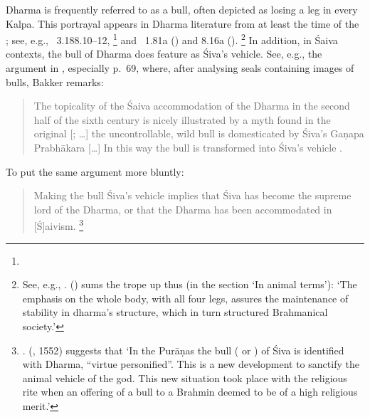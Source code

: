 Dharma is frequently referred to as a
bull, often depicted as losing a leg in every Kalpa.
This portrayal appears in Dharma literature from at least the time of the \MBh;
see, e.g., \MBH\ 3.188.10--12,%
	\footnote{}
and \Manu\ 1.81a
() and 8.16a
().%
	 \footnote{See, e.g., .
	 \citeauthor{GutierrezEmbodiment} (\citeyear{GutierrezEmbodiment})
	 sums the trope up thus
	 (in the section `In animal terms'): 
	 `The emphasis on the whole body, with all four legs, assures 
	 the maintenance of stability in dharma's structure, which in 
	 turn structured Brahmanical society.'}
In addition, in Śaiva contexts, the bull of Dharma
does feature as Śiva's vehicle. See, e.g., the argument in
, especially p.~69,
where, after analysing seals containing images of
bulls, Bakker remarks:


\begin{quote}
The topicality of the Śaiva accommodation 
of the Dharma in the second half of the 
sixth century is nicely illustrated by a myth found in the
original [; \dots]
the uncontrollable, wild bull  is 
domesticated by Śiva's Gaṇapa Prabhākara [\dots]
In this way the bull is transformed into Śiva’s vehicle . 
\end{quote}

\noindent
To put the same argument more bluntly:

\begin{quote}
Making the bull Śiva's vehicle implies that Śiva has become
the supreme lord of the Dharma, or that the Dharma has 
been accommodated in [Ś]aivism.%
	\footnote{.
	\citeauthor{bhattacharya_nandin_1977} 		
			(\citeyear{bhattacharya_nandin_1977}, {1552}) 
			suggests that `In the Purāṇas the bull
		( or 
		) 
	of Śiva is identified with Dharma, ``virtue personified''. 
		This is a new development to sanctify the animal 
		vehicle of the god. This new situation took place with the 		
		religious rite when an offering of a bull to a Brahmin   
		deemed to be	of a high religious merit.'}
\end{quote}


